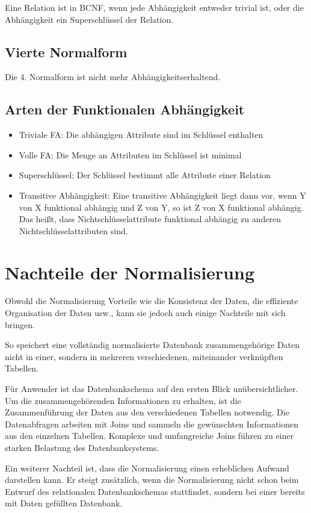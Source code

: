 Eine Relation ist in BCNF, wenn jede Abhängigkeit entweder trivial ist, oder die Abhängigkeit ein Superschlüssel der Relation.

\subsection{Vierte Normalform}

Die 4. Normalform ist nicht mehr Abhängigkeitserhaltend.

\subsection{Arten der Funktionalen Abhängigkeit}

\begin{itemize}
    \item Triviale FA: Die abhängigen Attribute sind im Schlüssel enthalten
    \item Volle FA: Die Menge an Attributen im Schlüssel ist minimal
    \item Superschlüssel: Der Schlüssel bestimmt alle Attribute einer Relation
    \item Transitive Abhängigkeit: Eine transitive Abhängigkeit liegt dann vor, wenn Y von X funktional abhängig und Z von Y, so ist Z von X funktional abhängig. Das heißt, dass Nichtschlüsselattribute funktional abhängig zu anderen Nichtschlüsselattributen sind.
\end{itemize}

\section{Nachteile der Normalisierung}

Obwohl die Normalisierung Vorteile wie die Konsistenz der Daten, die effiziente Organisation der Daten usw., kann sie jedoch auch einige Nachteile mit sich bringen.

So speichert eine vollständig normalisierte Datenbank zusammengehörige Daten nicht in einer, sondern in mehreren verschiedenen, miteinander verknüpften Tabellen.

Für Anwender ist das Datenbankschema auf den ersten Blick unübersichtlicher. Um die zusammengehörenden Informationen zu erhalten, ist die Zusammenführung der Daten aus den verschiedenen Tabellen notwendig.
Die Datenabfragen arbeiten mit Joins und sammeln die gewünschten Informationen aus den einzelnen Tabellen. Komplexe und umfangreiche Joins führen zu einer starken Belastung des Datenbanksystems.

Ein weiterer Nachteil ist, dass die Normalisierung einen erheblichen Aufwand darstellen kann. Er steigt zusätzlich, wenn die Normalisierung nicht schon beim Entwurf des relationalen Datenbankschemas stattfindet, sondern bei einer bereits mit Daten gefüllten Datenbank.
